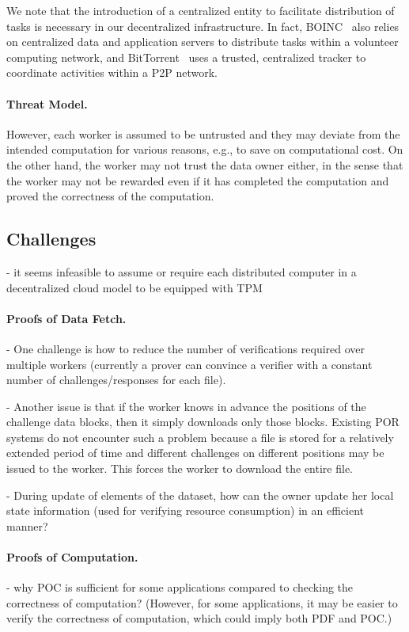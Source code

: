 We note that the introduction of a centralized entity to facilitate distribution of tasks is necessary in our decentralized infrastructure.
In fact, BOINC~\cite{And04} also relies on centralized data and application servers to distribute tasks within a volunteer computing network, and BitTorrent~\cite{Coh03} uses a trusted, centralized tracker to coordinate activities within a P2P network.

\paragraph{Threat Model.}
However, each worker is assumed to be untrusted and they may deviate from the intended computation for various reasons, e.g., to save on computational cost. 
On the other hand, the worker may not trust the data owner either, in the sense that the worker may not be rewarded even if it has completed the computation and proved the correctness of the computation.


\subsection{Challenges} \label{sect:challenges}

- it seems infeasible to assume or require each distributed computer in a decentralized cloud model to be equipped with TPM


\paragraph{Proofs of Data Fetch.}
- One challenge is how to reduce the number of verifications required over multiple workers (currently a prover can convince a verifier with a constant number of challenges/responses for each file). 

- Another issue is that if the worker knows in advance the positions of the challenge data blocks, then it simply downloads only those blocks. Existing POR systems do not encounter such a problem because a file is stored for a relatively extended period of time and different challenges on different positions may be issued to the worker. This forces the worker to download the entire file.

- During update of elements of the dataset, how can the owner update her local state information (used for verifying resource consumption) in an efficient manner?

\paragraph{Proofs of Computation.}
- why POC is sufficient for some applications compared to checking the correctness of computation? (However, for some applications, it may be easier to verify the correctness of computation, which could imply both PDF and POC.)





